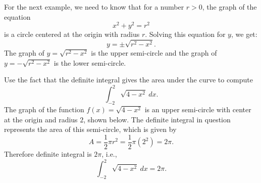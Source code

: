 \documentclass[handout]{ximera}
\begin{document}
For the next example, we need to know that for a number $r>0$,
the graph of the equation
\[x^2 + y^2 = r^2\]
is a circle centered at the origin with radius $r$.
Solving this equation for $y$, we get:
\[y = \pm \sqrt{r^2 - x^2}.\]
The graph of $y = \sqrt{r^2 -x^2}$ is the upper semi-circle and the
graph of $y = -\sqrt{r^2 -x^2}$ is the lower semi-circle.

\begin{example}[example 4]
Use the fact that the definite integral gives the area under the curve to compute
\[\int_{-2}^2 \sqrt{4-x^2} \ dx.\]
The graph of the function $f(x) = \sqrt{4-x^2}$ is an upper semi-circle with center at the origin and radius $2$, shown below. 
The definite integral in question represents the area of this semi-circle, which is given by
\[
A = \frac12 \pi r^2 = \frac12 \pi (2^2) = 2\pi.
\]
Therefore definite integral is $2\pi$, i.e.,
\[\int_{-2}^2 \sqrt{4-x^2} \ dx =2\pi.\]










\end{example}
\end{document}
